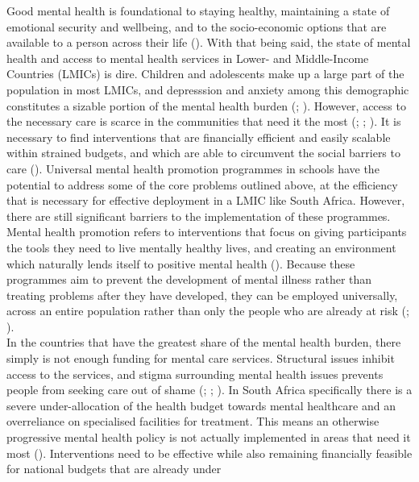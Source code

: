 \documentclass[DIV=calc,fontsize=12bp,a4paper]{scrartcl}
\begin{document}
\noindent
Good mental health is foundational to staying healthy, maintaining a state of
emotional security and wellbeing, and to the socio-economic options that are
available to a person across their life (\cite{barryetal13}). With that being
said, the state of mental health and access to mental health services in Lower-
and Middle-Income Countries (LMICs) is dire. Children and adolescents make up
a large part of the population in most LMICs, and depresssion and anxiety among
this demographic constitutes a sizable portion of the mental health burden
(\cite{barryetal13}; \cite{Oseral21}). However, access to the necessary care is
scarce in the communities that need it the most (\cite{Osetal20b};
\cite{Osetal20}; \cite{Oseral21}). It is necessary to find interventions that
are financially efficient and easily scalable within strained budgets, and
which are able to circumvent the social barriers to care (\cite{Osetal20b}).
Universal mental health promotion programmes in schools have the potential to
address some of the core problems outlined above, at the efficiency that is
necessary for effective deployment in a LMIC like South Africa. However, there
are still significant barriers to the implementation of these programmes. \\
Mental health promotion refers to interventions that focus on giving
participants the tools they need to live mentally healthy lives, and creating
an environment which naturally lends itself to positive mental health
(\cite{oretal18}). Because these programmes aim to prevent the development of
mental illness rather than treating problems after they have developed, they
can be employed universally, across an entire population rather than
only the people who are already at risk (\cite{Osetal20}; \cite{riduvetal11}). \\
In the countries that have the greatest share of the mental health burden,
there simply is not enough funding for mental care services. Structural issues
inhibit access to the services, and stigma surrounding mental health issues
prevents people from seeking care out of shame (\cite{barryetal13};
\cite{oretal18}; \cite{Osetal20b}). In South Africa specifically there is a
severe under-allocation of the health budget towards mental healthcare and an
overreliance on specialised facilities for treatment. This means an otherwise
progressive mental health policy is not actually implemented in areas that need
it most (\cite{docetal19}). Interventions need to be effective while also
remaining financially feasible for national budgets that are already under
\end{document}
